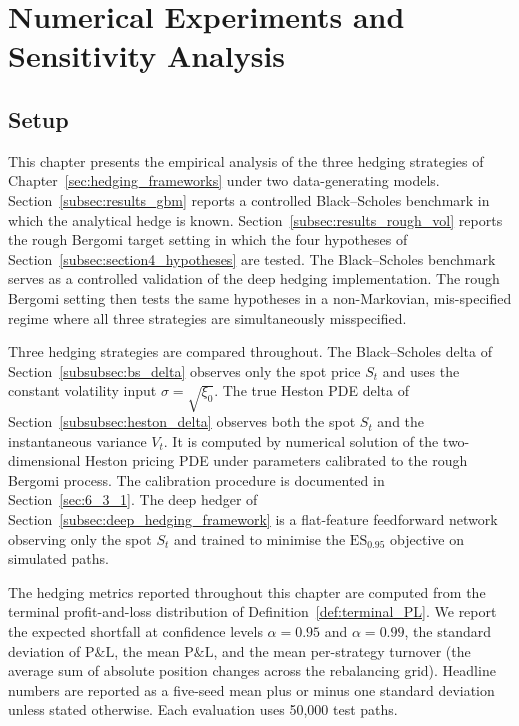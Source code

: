 \documentclass[12pt,a4paper]{article}
\theoremstyle{definition}
\theoremstyle{plain}
\theoremstyle{remark}
\theoremstyle{plain}
\begin{document}
\section{Numerical Experiments and Sensitivity Analysis}
\label{sec:numerical_experiments}

\subsection{Setup}
\label{sec:numerical_setup}

This chapter presents the empirical analysis of the three hedging
strategies of Chapter~\ref{sec:hedging_frameworks} under two
data-generating models. Section~\ref{subsec:results_gbm} reports a
controlled Black--Scholes benchmark in which the analytical hedge is
known. Section~\ref{subsec:results_rough_vol} reports the rough Bergomi
target setting in which the four hypotheses of
Section~\ref{subsec:section4_hypotheses} are tested. The Black--Scholes
benchmark serves as a controlled validation of the deep hedging
implementation. The rough Bergomi setting then tests the same hypotheses
in a non-Markovian, mis-specified regime where all three strategies are
simultaneously misspecified.

Three hedging strategies are compared throughout. The Black--Scholes
delta of Section~\ref{subsubsec:bs_delta} observes only the spot price
$S_t$ and uses the constant volatility input $\sigma = \sqrt{\xi_0}$.
The true Heston PDE delta of Section~\ref{subsubsec:heston_delta}
observes both the spot $S_t$ and the instantaneous variance $V_t$. It
is computed by numerical solution of the two-dimensional Heston pricing
PDE under parameters calibrated to the rough Bergomi process. The
calibration procedure is documented in Section~\ref{sec:6_3_1}. The
deep hedger of Section~\ref{subsec:deep_hedging_framework} is a
flat-feature feedforward network observing only the spot $S_t$ and
trained to minimise the $\mathrm{ES}_{0.95}$ objective on simulated
paths.

The hedging metrics reported throughout this chapter are computed from
the terminal profit-and-loss distribution of
Definition~\ref{def:terminal_PL}. We report the expected shortfall at
confidence levels $\alpha = 0.95$ and $\alpha = 0.99$, the standard
deviation of $\mathrm{P\&L}$, the mean $\mathrm{P\&L}$, and the
mean per-strategy turnover (the average sum of absolute position
changes across the rebalancing grid). Headline numbers are reported as
a five-seed mean plus or minus one standard deviation unless stated
otherwise. Each evaluation uses 50{,}000 test paths.
\end{document}

